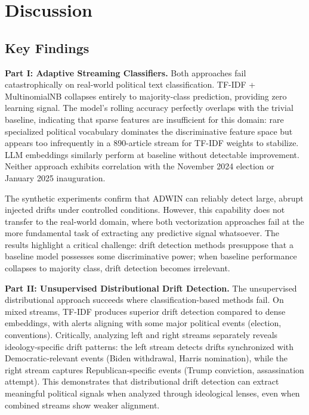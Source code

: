 \documentclass[
	a4paper,
	10pt,
	unnumberedsections,
	twoside,
]{LTJournalArticle}
\begin{document}
\newpage
\section{Discussion}

\subsection{Key Findings}

\textbf{Part I: Adaptive Streaming
Classifiers.} Both approaches fail catastrophically on real-world political text classification. TF-IDF + MultinomialNB collapses entirely to majority-class prediction, providing zero learning signal. The model's rolling accuracy perfectly overlaps with the trivial baseline, indicating that sparse features are insufficient for this domain: rare specialized political vocabulary dominates the discriminative feature space but appears too infrequently in a 890-article stream for TF-IDF weights to stabilize. LLM embeddings similarly perform at baseline without detectable improvement. Neither approach exhibits correlation with the November 2024 election or January 2025 inauguration.

The synthetic experiments confirm that ADWIN can reliably detect large, abrupt injected drifts under controlled conditions. However, this capability does not transfer to the real-world domain, where both vectorization approaches fail at the more fundamental task of extracting any predictive signal whatsoever. The results highlight a critical challenge: drift detection methods presuppose that a baseline model possesses some discriminative power; when baseline performance collapses to majority class, drift detection becomes irrelevant.

\textbf{Part II: Unsupervised
Distributional Drift Detection.} The unsupervised distributional approach succeeds where classification-based methods fail. On mixed streams, TF-IDF produces superior drift detection compared to dense embeddings, with alerts aligning with some major political events (election, conventions). Critically, analyzing left and right streams separately reveals ideology-specific drift patterns: the left stream detects drifts synchronized with Democratic-relevant events (Biden withdrawal, Harris nomination), while the right stream captures Republican-specific events (Trump conviction, assassination attempt). This demonstrates that distributional drift detection can extract meaningful political signals when analyzed through ideological lenses, even when combined streams show weaker alignment.
\end{document}
